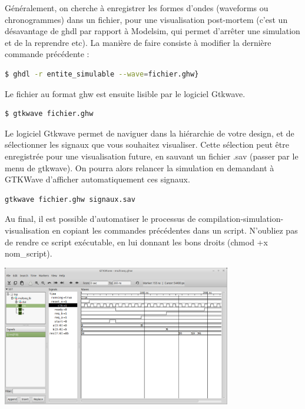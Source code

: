 Généralement, on cherche à enregistrer les formes d'ondes (waveforms ou chronogrammes) dans un fichier, pour une visualisation post-mortem (c'est un désavantage de ghdl par rapport à Modelsim, qui permet d'arrêter une simulation et de la reprendre etc). La manière de faire consiste à modifier la dernière commande précédente :

\begin{lstlisting}[language=bash]
 $ ghdl -r entite_simulable --wave=fichier.ghw}
\end{lstlisting}

Le fichier au format ghw est ensuite lisible par le logiciel Gtkwave.

\begin{lstlisting}[language=bash]
    $ gtkwave fichier.ghw
\end{lstlisting}

Le logiciel Gtkwave permet de naviguer dans la hiérarchie de votre design, et de sélectionner les signaux que vous souhaitez visualiser.
Cette sélection peut être enregistrée pour une visualisation future, en sauvant un fichier .sav (passer par le menu de gtkwave). On pourra alors
relancer la simulation en demandant à GTKWave d'afficher automatiquement ces signaux.

\begin{lstlisting}[language=bash]
  gtkwave fichier.ghw signaux.sav
\end{lstlisting}

Au final, il est possible d'automatiser le processus de compilation-simulation-visualisation en copiant les commandes précédentes dans un script.
N'oubliez pas de rendre ce script exécutable, en lui donnant les bons droits (chmod +x nom\_script).

\begin{center}
\begin{minipage}[t]{10cm}
 \centering
 \includegraphics[width=10cm]{./figures/gtkwave.png}
\end{minipage}
\end{center}

